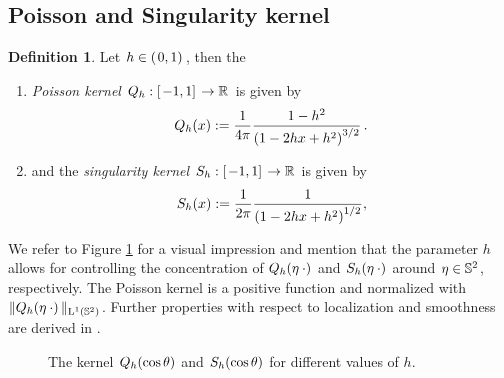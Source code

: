 \documentclass[11pt,a4paper,twoside,bibtotoc]{scrartcl}
\theoremstyle{plain}
\theoremstyle{definition}
\newtheorem{definition}[theorem]{Definition}
\theoremstyle{remark}
\numberwithin{equation}{section}
\numberwithin{table}{section}
\numberwithin{figure}{section}
\begin{document}
\subsection{Poisson and Singularity kernel}
\begin{definition}
  Let $h \in \left(\left.0,1\right)\right.$, then the
  \begin{enumerate}
  \item \emph{Poisson kernel}
    $Q_{h}:\left[\left.-1,1\right]\right. \rightarrow \mathbb{R}$ is given by
    \[
    Q_{h}{\hspace{-0.4ex}}\left(x\right) := \frac{1}{4\pi} \frac{1-h^2}{\left(1-2hx+h^2\right)^{3/2}}\,.
    \]
  \item and the \emph{singularity kernel}
    $S_{h}:\left[\left.-1,1\right]\right. \rightarrow \mathbb{R}$ is given by
    \[
    S_{h}{\hspace{-0.4ex}}\left(x\right) := \frac{1}{2\pi} \frac{1}{\left(1-2hx+h^2\right)^{1/2}},
    \]
  \end{enumerate}
\end{definition}

We refer to Figure \ref{Basics:Figure:PoissonSingularityKernel} for a visual
impression and mention that the parameter $h$ allows for controlling the
concentration of $Q_{h}{\hspace{-0.4ex}}\left(\mathbf{\eta} \: \cdot\right)$ and $S_{h}{\hspace{-0.4ex}}\left(\mathbf{\eta} \:
  \cdot\right)$ around $\eta \in \mathbb{S}^2$, respectively.
The Poisson kernel is a positive function and normalized with
$\|Q_{h}{\hspace{-0.4ex}}\left(\mathbf{\eta} \: \cdot\right)\|_{\text{\rm{L}}^{1}\left(\mathbb{S}^2\right)}$.
Further properties with respect to localization and smoothness are derived
in \cite[pp. 112]{frgesc}.

\begin{figure}[tb]
  \centering
  \hfill
  \caption{The kernel $Q_{h}{\hspace{-0.4ex}}\left(\cos\theta\right)$ and $S_{h}{\hspace{-0.4ex}}\left(\cos\theta\right)$
  for different values of $h$.}
  \label{Basics:Figure:PoissonSingularityKernel}
\end{figure}
\end{document}

